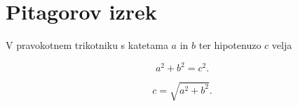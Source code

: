 \documentclass{article}
\begin{document}
\section*{Pitagorov izrek}

V pravokotnem trikotniku s katetama \(a\) in \(b\)
ter hipotenuzo \(c\) velja

\[
a^2+b^2=c^2.
\]

\[
c=\sqrt{a^2+b^2}.
\]
\end{document}
